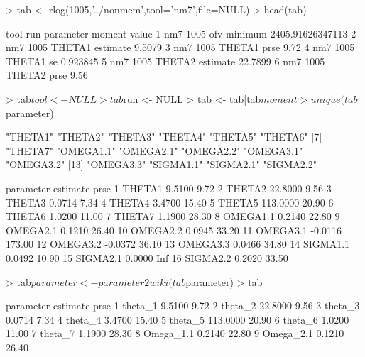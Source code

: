 \begin{Schunk}
\begin{Sinput}
> tab <- rlog(1005,'../nonmem',tool='nm7',file=NULL)
> head(tab)
\end{Sinput}
\begin{Soutput}
  tool  run parameter   moment            value
1  nm7 1005       ofv  minimum 2405.91626347113
2  nm7 1005    THETA1 estimate           9.5079
3  nm7 1005    THETA1     prse             9.72
4  nm7 1005    THETA1       se         0.923845
5  nm7 1005    THETA2 estimate          22.7899
6  nm7 1005    THETA2     prse             9.56
\end{Soutput}
\begin{Sinput}
> tab$tool <- NULL
> tab$run <- NULL
> tab <- tab[tab$moment %in% c('estimate','prse'),]
> unique(tab$parameter)
\end{Sinput}
\begin{Soutput}
 [1] "THETA1"   "THETA2"   "THETA3"   "THETA4"   "THETA5"   "THETA6"  
 [7] "THETA7"   "OMEGA1.1" "OMEGA2.1" "OMEGA2.2" "OMEGA3.1" "OMEGA3.2"
[13] "OMEGA3.3" "SIGMA1.1" "SIGMA2.1" "SIGMA2.2"
\end{Soutput}
\begin{Soutput}
   parameter estimate   prse
1     THETA1   9.5100   9.72
2     THETA2  22.8000   9.56
3     THETA3   0.0714   7.34
4     THETA4   3.4700  15.40
5     THETA5 113.0000  20.90
6     THETA6   1.0200  11.00
7     THETA7   1.1900  28.30
8   OMEGA1.1   0.2140  22.80
9   OMEGA2.1   0.1210  26.40
10  OMEGA2.2   0.0945  33.20
11  OMEGA3.1  -0.0116 173.00
12  OMEGA3.2  -0.0372  36.10
13  OMEGA3.3   0.0466  34.80
14  SIGMA1.1   0.0492  10.90
15  SIGMA2.1   0.0000    Inf
16  SIGMA2.2   0.2020  33.50
\end{Soutput}
\begin{Sinput}
> tab$parameter <- parameter2wiki(tab$parameter)
> tab
\end{Sinput}
\begin{Soutput}
    parameter estimate   prse
1    theta_1    9.5100   9.72
2    theta_2   22.8000   9.56
3    theta_3    0.0714   7.34
4    theta_4    3.4700  15.40
5    theta_5  113.0000  20.90
6    theta_6    1.0200  11.00
7    theta_7    1.1900  28.30
8  Omega_1.1    0.2140  22.80
9  Omega_2.1    0.1210  26.40

\end{Soutput}
\end{Schunk}
